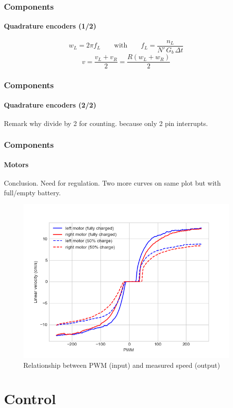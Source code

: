 \documentclass{beamer}
\begin{document}

\begin{frame}
\frametitle{Components}
\framesubtitle{Quadrature encoders (1/2)}
$$ 
w_L = 2\pi f_L
\qquad\text{with}\qquad	
f_L = \frac{n_L}{N' \, G_b \, \Delta{t} }
$$
$$ 
v = \frac{v_L + v_R}{2} = \frac{R(w_L + w_R)}{2}
$$
\end{frame}


\begin{frame}
\frametitle{Components}
\framesubtitle{Quadrature encoders (2/2)}
Remark why divide by 2 for counting. because only 2 pin interrupts.
\end{frame}


\begin{frame}
\frametitle{Components}
\framesubtitle{Motors}
Conclusion. Need for regulation. Two more curves on same plot but with full/empty battery.
\begin{figure}[hbtp]
\centering
\includegraphics[scale=0.4]{figures/motors_merged.png}
\caption{Relationship between PWM (input) and measured speed (output)}
\end{figure}

\end{frame}


\section{Control} 
\end{document}
